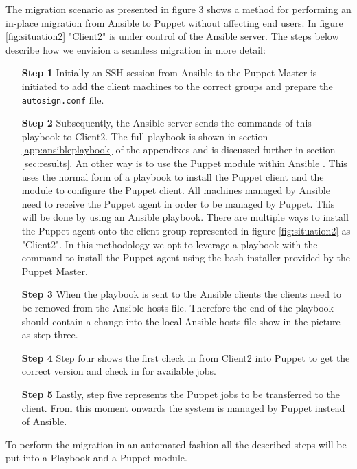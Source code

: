 The migration scenario as presented in figure 3 shows a method for performing an in-place migration from Ansible to Puppet without affecting end users. In figure \ref{fig:situation2} "Client2" is under control of the Ansible server. The steps below describe how we envision a seamless migration in more detail:

\indent
\begin{itemize}
    \item[\bf Step 1] Initially an SSH session from Ansible to the Puppet Master is initiated to add the client machines to the correct groups and prepare the \texttt{autosign.conf} file. 
    
    \item[\bf Step 2] Subsequently, the Ansible server sends the commands of this playbook to Client2. The full playbook is shown in section \ref{app:ansibleplaybook} of the appendixes and is discussed further in section \ref{sec:results}. An other way is to use the Puppet module within Ansible \cite{ansiblepuppet}. This uses the normal form of a playbook to install the Puppet client and the module to configure the Puppet client.     All machines managed by Ansible need to receive the Puppet agent in order to be managed by Puppet. This will be done by using an Ansible playbook. There are multiple ways to install the Puppet agent onto the client group represented in figure \ref{fig:situation2} as "Client2". In this methodology we opt to leverage a playbook with the command to install the Puppet agent using the bash installer provided by the Puppet Master.

    \item[\bf Step 3] When the playbook is sent to the Ansible clients the clients need to be removed from the Ansible hosts file. Therefore the end of the playbook should contain a change into the local Ansible hosts file show in the picture as step three.

    \item[\bf Step 4] Step four shows the first check in from Client2 into Puppet to get the correct version and check in for available jobs.

    \item[\bf Step 5] Lastly, step five represents the Puppet jobs to be transferred to the client. From this moment onwards the system is managed by Puppet instead of Ansible.

\end{itemize}

To perform the migration in an automated fashion all the described steps will be put into a Playbook and a Puppet module.

